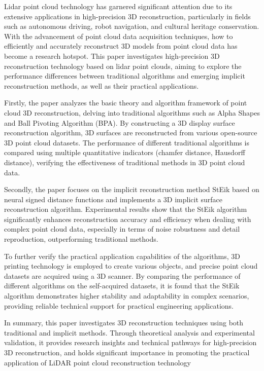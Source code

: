 Lidar point cloud technology has garnered significant attention due to its extensive applications in high-precision 3D reconstruction, particularly in fields such as autonomous driving, robot navigation, and cultural heritage conservation. With the advancement of point cloud data acquisition techniques, how to efficiently and accurately reconstruct 3D models from point cloud data has become a research hotspot. This paper investigates high-precision 3D reconstruction technology based on lidar point clouds, aiming to explore the performance differences between traditional algorithms and emerging implicit reconstruction methods, as well as their practical applications.

Firstly, the paper analyzes the basic theory and algorithm framework of point cloud 3D reconstruction, delving into traditional algorithms such as Alpha Shapes and Ball Pivoting Algorithm (BPA). By constructing a 3D display surface reconstruction algorithm, 3D surfaces are reconstructed from various open-source 3D point cloud datasets. The performance of different traditional algorithms is compared using multiple quantitative indicators (chamfer distance, Hausdorff distance), verifying the effectiveness of traditional methods in 3D point cloud data.

Secondly, the paper focuses on the implicit reconstruction method StEik based on neural signed distance functions and implements a 3D implicit surface reconstruction algorithm. Experimental results show that the StEik algorithm significantly enhances reconstruction accuracy and efficiency when dealing with complex point cloud data, especially in terms of noise robustness and detail reproduction, outperforming traditional methods.

To further verify the practical application capabilities of the algorithms, 3D printing technology is employed to create various objects, and precise point cloud datasets are acquired using a 3D scanner. By comparing the performance of different algorithms on the self-acquired datasets, it is found that the StEik algorithm demonstrates higher stability and adaptability in complex scenarios, providing reliable technical support for practical engineering applications.

In summary, this paper investigates 3D reconstruction techniques using both traditional and implicit methods. Through theoretical analysis and experimental validation, it provides research insights and technical pathways for high-precision 3D reconstruction, and holds significant importance in promoting the practical application of LiDAR point cloud reconstruction technology